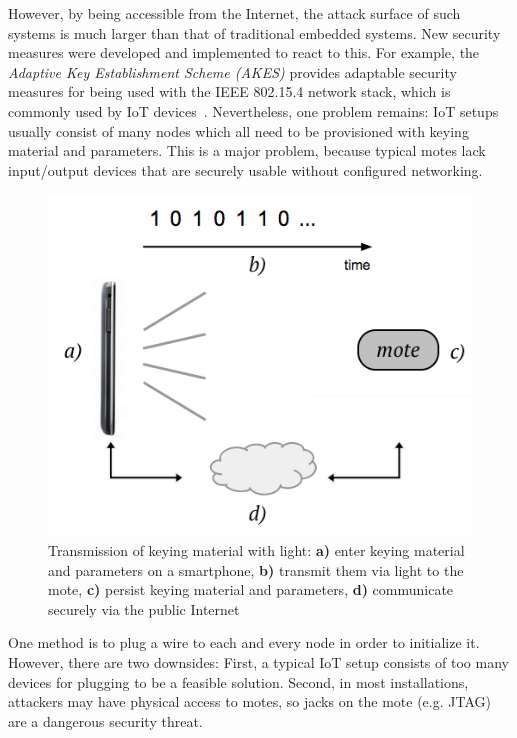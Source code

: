 \documentclass{ewsn-proc} %
\begin{document}
However, by being accessible from the Internet, the attack surface of such systems is much larger than that of traditional embedded systems.
New security measures were developed and implemented to react to this.
For example, the \textit{Adaptive Key Establishment Scheme (AKES)} provides adaptable security measures for being used with the IEEE 802.15.4 network stack, which is commonly used by IoT devices~\cite{krentz15akes}.
Nevertheless, one problem remains: IoT setups usually consist of many nodes which all need to be provisioned with keying material and parameters.
This is a major problem, because typical motes lack input/output devices that are securely usable without configured networking.

\begin{figure}
	\centering
	\includegraphics[scale=.4]{images/overview.png}
	\caption{Transmission of keying material with light: \textbf{a)} enter keying material and parameters on a smartphone, \textbf{b)} transmit them via light to the mote, \textbf{c)} persist keying material and parameters, \textbf{d)} communicate securely via the public Internet }
	\label{fig:overview}
\end{figure}

One method is to plug a wire to each and every node in order to initialize it.
However, there are two downsides: First, a typical IoT setup consists of too many devices for plugging to be a feasible solution. Second, in most installations, attackers may have physical access to motes, so jacks on the mote (e.g. JTAG) are a dangerous security threat.
\end{document}
